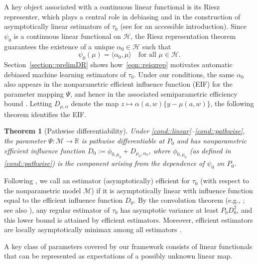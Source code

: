 \documentclass[11pt]{article}
\theoremstyle{plain}
\newtheorem{theorem}{Theorem}
\begin{document}
A key object associated with a continuous linear functional is its Riesz
representer, which plays a central role in debiasing and in the construction of
asymptotically linear estimators of \(\tau_0\) (see \cite{williams2025riesz} for an
accessible introduction). Since \(\psi_0\) is a continuous linear functional on
\(\mathcal{H}\), the Riesz representation theorem guarantees the existence of a
unique \(\alpha_0 \in \mathcal{H}\) such that
\begin{equation}
\label{eqn::reiszrep}
\psi_0(\mu) = \langle \alpha_0, \mu \rangle
\quad \text{for all } \mu \in \mathcal{H}.
\end{equation}
Section~\ref{section::prelimDR} shows how~\eqref{eqn::reiszrep} motivates
automatic debiased machine learning estimators of \(\tau_0\).  Under our
conditions, the same \(\alpha_0\) also appears in the nonparametric efficient
influence function (EIF) for the parameter mapping \(\Psi\), and hence in the
associated semiparametric efficiency bound \citep{bickel1993efficient}. Letting \(D_{\mu,\alpha}\) denote the map \(z \mapsto \alpha(a,w)\{y-\mu(a,w)\}\),
the following theorem identifies the EIF.

\begin{theorem}[Pathwise differentiability]
\label{theorem::EIF}
Under \ref{cond::linear}--\ref{cond::pathwise}, the parameter
\(\Psi:\mathcal{M} \rightarrow \mathbb{R}\) is pathwise differentiable at \(P_0\)
and has nonparametric efficient influence function
\(D_0 := \phi_{0,\mu_0} + D_{\mu_0,\alpha_0}\),
where \(\phi_{0,\mu_0}\) (as defined in \ref{cond::pathwise}) is the component
arising from the dependence of \(\psi_0\) on \(P_0\).
\end{theorem}

{\color{purple}
Following \cite{van2000asymptotic}, we call an estimator
(asymptotically) efficient for \(\tau_0\) (with respect to the nonparametric model
\(\mathcal{M}\)) if it is asymptotically linear with influence function equal to
the efficient influence function \(D_0\). By the convolution theorem (e.g.,
\citealp[Ch.~25]{van2000asymptotic}; see also \citealp{van1996weak}), any regular
estimator of \(\tau_0\) has asymptotic variance at least \(P_0 D_0^2\), and this
lower bound is attained by efficient estimators. Moreover, efficient estimators
are locally asymptotically minimax among all estimators
\citep{hajek1972local,le2012asymptotic}.
}

A key class of parameters covered by our framework consists
of linear functionals that can be represented as expectations of a possibly unknown
linear map.
\end{document}
